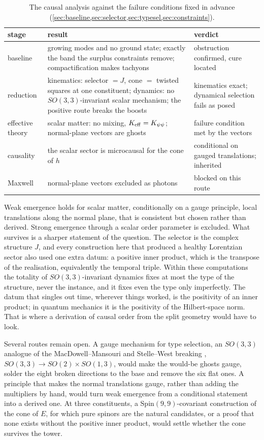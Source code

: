 \begin{table}[t]
\centering
\small
\begin{tabular}{@{}>{\raggedright\arraybackslash}p{2.3cm}>{\raggedright\arraybackslash}p{6.6cm}>{\raggedright\arraybackslash}p{5.1cm}@{}}
\toprule
stage & result & verdict\\
\midrule
baseline & growing modes and no ground state; exactly the band the surplus constraints remove; compactification makes tachyons & obstruction confirmed, cure located\\
reduction & kinematics: selector $=J$, cone $=$ twisted squares at one constituent; dynamics: no $SO(3,3)$-invariant scalar mechanism; the positive route breaks the boosts &
kinematics exact; dynamical selection fails as posed\\
effective theory & scalar matter: no mixing, $K_{\rm eff}=K_{\psi\psi}$; normal-plane vectors are ghosts & failure condition met by the vectors\\
causality & the scalar sector is microcausal for the cone of $h$ & conditional on gauged translations; inherited\\
Maxwell & normal-plane vectors excluded as photons & blocked on this route\\
\bottomrule
\end{tabular}
\caption{The causal analysis against the failure conditions fixed in advance (\cref{sec:baseline,sec:selector,sec:typesel,sec:constraints}).}
\label{tab:causal}
\end{table}

Weak emergence holds for scalar matter, conditionally on a gauge principle, local translations along the normal plane, that is consistent but chosen rather than derived.
Strong emergence through a scalar order parameter is excluded. What survives is a sharper statement of the question. The selector is the complex structure $J$, and every
construction here that produced a healthy Lorentzian sector also used one extra datum: a positive inner product, which is the transpose of the realisation, equivalently
the temporal triple. Within these computations the totality of $SO(3,3)$-invariant dynamics fixes at most the type of the structure, never the instance, and it fixes even
the type only imperfectly. The datum that singles out time, wherever things worked, is the positivity of an inner product; in quantum mechanics it is the positivity of
the Hilbert-space norm. That is where a derivation of causal order from the split geometry would have to look.

Several routes remain open. A gauge mechanism for type selection, an $SO(3,3)$ analogue of the MacDowell--Mansouri and Stelle--West breaking
\cite{MacDowellMansouri77,StelleWest80}, $SO(3,3)\to SO(2)\times SO(1,3)$, would make the would-be ghosts gauge, solder the eight broken directions to the base and remove the six
flat ones. A principle that makes the normal translations gauge, rather than adding the multipliers by hand, would turn weak emergence from a conditional statement into a
derived one. At three constituents, a $\mathrm{Spin}(9,9)$-covariant construction of the cone of $E$, for which pure spinors are the natural candidates, or a proof that
none exists without the positive inner product, would settle whether the cone survives the tower.
